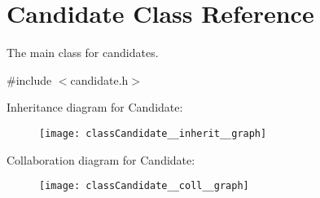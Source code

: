 \hypertarget{classCandidate}{}\section{Candidate Class Reference}
\label{classCandidate}


The main class for candidates.  




{\ttfamily \#include $<$candidate.\+h$>$}



Inheritance diagram for Candidate\+:\nopagebreak
\begin{figure}[H]
\begin{center}
\leavevmode
\texttt{[image: classCandidate\_\_inherit\_\_graph]}
\end{center}
\end{figure}


Collaboration diagram for Candidate\+:\nopagebreak
\begin{figure}[H]
\begin{center}
\leavevmode
\texttt{[image: classCandidate\_\_coll\_\_graph]}
\end{center}
\end{figure}
